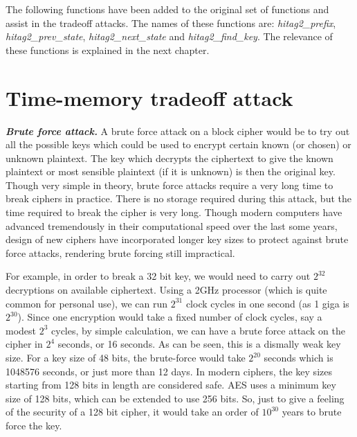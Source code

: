 The following functions have been added to the original set of functions and assist in the tradeoff attacks. The names of these functions are: \textit{hitag2\_prefix}, \textit{hitag2\_prev\_state}, \textit{hitag2\_next\_state} and \textit{hitag2\_find\_key}. The relevance of these functions is explained in the next chapter. 


\section{Time-memory tradeoff attack}
\label{sec:tmto-attack-intro}
\noindent \textit{\textbf{Brute force attack.}} A brute force attack on a block cipher would be to try out all the possible keys which could be used to encrypt certain known (or chosen) or unknown plaintext. The key which decrypts the ciphertext to give the known plaintext or most sensible plaintext (if it is unknown) is then the original key. Though very simple in theory, brute force attacks require a very long time to break ciphers in practice. There is no storage required during this attack, but the time required to break the cipher is very long. Though modern computers have advanced tremendously in their computational speed over the last some years, design of new ciphers have incorporated longer key sizes to protect against brute force attacks, rendering brute forcing still impractical.

For example, in order to break a 32 bit key, we would need to carry out $2^{32}$ decryptions on available ciphertext. Using a 2GHz processor (which is quite common for personal use), we can run $2^{31}$ clock cycles in one second (as 1 giga is $2^{30}$). Since one encryption would take a fixed number of clock cycles, say a modest $2^3$ cycles, by simple calculation, we can have a brute force attack on the cipher in $2^4$ seconds, or 16 seconds. As can be seen, this is a dismally weak key size. For a key size of 48 bits, the brute-force would take $2^{20}$ seconds which is 1048576 seconds, or just more than 12 days. In modern ciphers, the key sizes starting from 128 bits in length are considered safe. AES uses a minimum key size of 128 bits, which can be extended to use 256 bits. So, just to give a feeling of the security of a 128 bit cipher, it would take an order of $10^{30}$ years to brute force the key.\\

